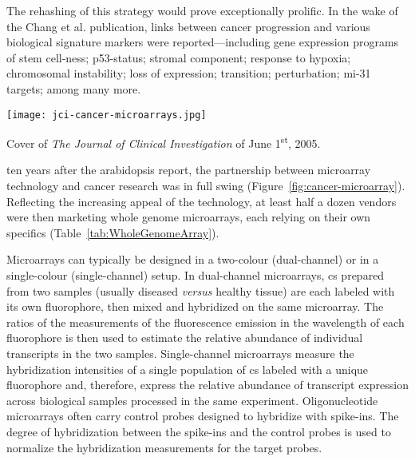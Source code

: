 The rehashing of this strategy would prove exceptionally prolific.  In the wake
of the Chang et al. publication, links between cancer progression and various
biological signature markers were reported---including gene expression programs
of stem
\mbox{cell-ness};\cite{glinsky_microarray_2005,ben-porath_embryonic_2008}
p53-status;\cite{miller_expression_2005} stromal
component;\cite{west_determination_2005} response to
hypoxia;\cite{chi_gene_2006} chromosomal
instability;\cite{carter_signature_2006,buffa_large_2010} loss of
\emph{} expression;\cite{saal_poor_2007} 
transition;\cite{welm_macrophage-stimulating_2007,taube_core_2010}
\emph{} perturbation;\cite{hallstrom_e2f1-dependent_2008}
mi-31 targets;\cite{valastyan_tumor_2011} among many more.

\medskip

\begin{marginfigure}%
  \texttt{[image: jci-cancer-microarrays.jpg]}
  \caption[Cover of \emph{The Journal of Clinical Investigation} of June
  1\textsuperscript{st}, 2005]{Cover of \emph{The Journal of Clinical
      Investigation} of June 1\textsuperscript{st}, 2005.}
  \label{fig:cancer-microarray}
\end{marginfigure}

 ten years after the arabidopsis report, the partnership
between microarray technology and cancer research was in full swing
(Figure~\ref{fig:cancer-microarray}).  Reflecting the increasing appeal of the
technology, at least half a dozen vendors were then marketing whole genome
microarrays, each relying on their own specifics
(Table~\ref{tab:WholeGenomeArray}).

Microarrays can typically be designed in a \mbox{two-colour}
(\mbox{dual-channel}) or in a \mbox{single-colour} (\mbox{single-channel})
setup.  In \mbox{dual-channel} microarrays, cs prepared from two
samples (usually diseased \emph{versus} healthy tissue) are each labeled with
its own fluorophore, then mixed and hybridized on the same microarray.  The
ratios of the measurements of the fluorescence emission in the wavelength of
each fluorophore is then used to estimate the relative abundance of individual
transcripts in the two samples.  \mbox{Single-channel} microarrays measure the
hybridization intensities of a single population of cs labeled
with a unique fluorophore and, therefore, express the relative abundance of
transcript expression across biological samples processed in the same
experiment.  Oligonucleotide microarrays often carry control probes designed to
hybridize with  \mbox{spike-ins}.  The degree of hybridization
between the \mbox{spike-ins} and the control probes is used to normalize the
hybridization measurements for the target probes.


